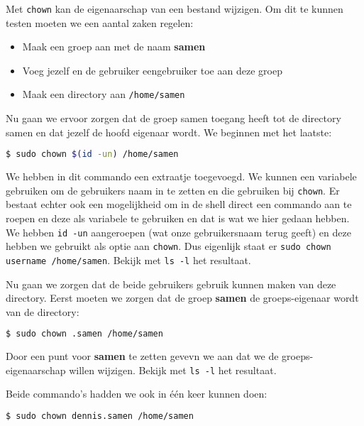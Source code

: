 Met \texttt{chown} kan de eigenaarschap van een bestand wijzigen. Om dit te kunnen testen moeten we een aantal zaken regelen:
\begin{itemize}
\item Maak een groep aan met de naam \textbf{samen}
\item Voeg jezelf en de gebruiker eengebruiker toe aan deze groep
\item Maak een directory aan \texttt{/home/samen}
\end{itemize}

Nu gaan we ervoor zorgen dat de groep samen toegang heeft tot de directory samen en dat jezelf de hoofd eigenaar wordt. We beginnen met het laatste:
\begin{lstlisting}[language=bash]
$ sudo chown $(id -un) /home/samen
\end{lstlisting}
We hebben in dit commando een extraatje toegevoegd. We kunnen een variabele gebruiken om de gebruikers naam in te zetten en die gebruiken bij \texttt{chown}. Er bestaat echter ook een mogelijkheid om in de shell direct een commando aan te roepen en deze als variabele te gebruiken en dat is wat we hier gedaan hebben. We hebben \texttt{id -un} aangeroepen (wat onze gebruikersnaam terug geeft) en deze hebben we gebruikt als optie aan \texttt{chown}. Dus eigenlijk staat er \texttt{sudo chown username /home/samen}. Bekijk met \texttt{ls -l} het resultaat.

Nu gaan we zorgen dat de beide gebruikers gebruik kunnen maken van deze directory. Eerst moeten we zorgen dat de groep \textbf{samen} de groeps-eigenaar wordt van de directory:
\begin{lstlisting}[language=bash]
$ sudo chown .samen /home/samen
\end{lstlisting}
Door een punt voor \textbf{samen} te zetten gevevn we aan dat we de groeps-eigenaarschap willen wijzigen. Bekijk met \texttt{ls -l} het resultaat.

Beide commando's hadden we ook in \'e\'en keer kunnen doen:
\begin{lstlisting}[language=bash]
$ sudo chown dennis.samen /home/samen
\end{lstlisting}

